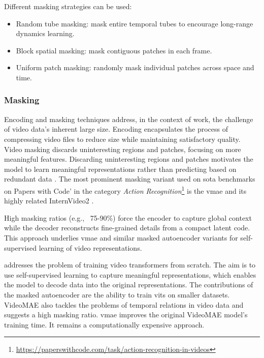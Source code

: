Different masking strategies can be used:
\begin{itemize}
    \item Random tube masking: mask entire temporal tubes to encourage long-range dynamics learning.
    \item Block spatial masking: mask contiguous patches in each frame.
    \item Uniform patch masking: randomly mask individual patches across space and time.
\end{itemize}

\subsubsection{Masking}

Encoding and masking techniques address, in the context of work, the challenge of video data's inherent large size. Encoding encapsulates the process of compressing video files to reduce size while maintaining satisfactory quality. Video masking discards uninteresting regions and patches, focusing on more meaningful features. Discarding uninteresting regions and patches motivates the model to learn meaningful representations rather than predicting based on redundant data \cite{tong_videomae_2022}. The most prominent masking variant used on \acrshort{sota} benchmarks on Papers with Code' in the category \textit{Action Recognition}\footnote{\url{https://paperswithcode.com/task/action-recognition-in-videos}} is the \acrfull{vmae} \cite{wang_videomae_2023} and its highly related InternVideo2 \cite{wang_internvideo2_2024}. 

High masking ratios (e.g., \ 75-90\%) force the encoder to capture global context while the decoder reconstructs fine-grained details from a compact latent code. This approach underlies \acrshort{vmae} and similar masked autoencoder variants for self-supervised learning of video representations.

\textcite{tong_videomae_2022} addresses the problem of training video transformers from scratch. The aim is to use self-supervised learning to capture meaningful representations, which enables the model to decode data into the original representations. The contributions of the masked autoencoder \cite{tong_videomae_2022} are the ability to train \acrshort{vit}s on smaller datasets. VideoMAE \cite{tong_videomae_2022} also tackles the problems of temporal relations in video data and suggests a high masking ratio. \acrfull{vmae} \cite{wang_videomae_2023} improves the original VideoMAE model's training time. It remains a computationally expensive approach. 


